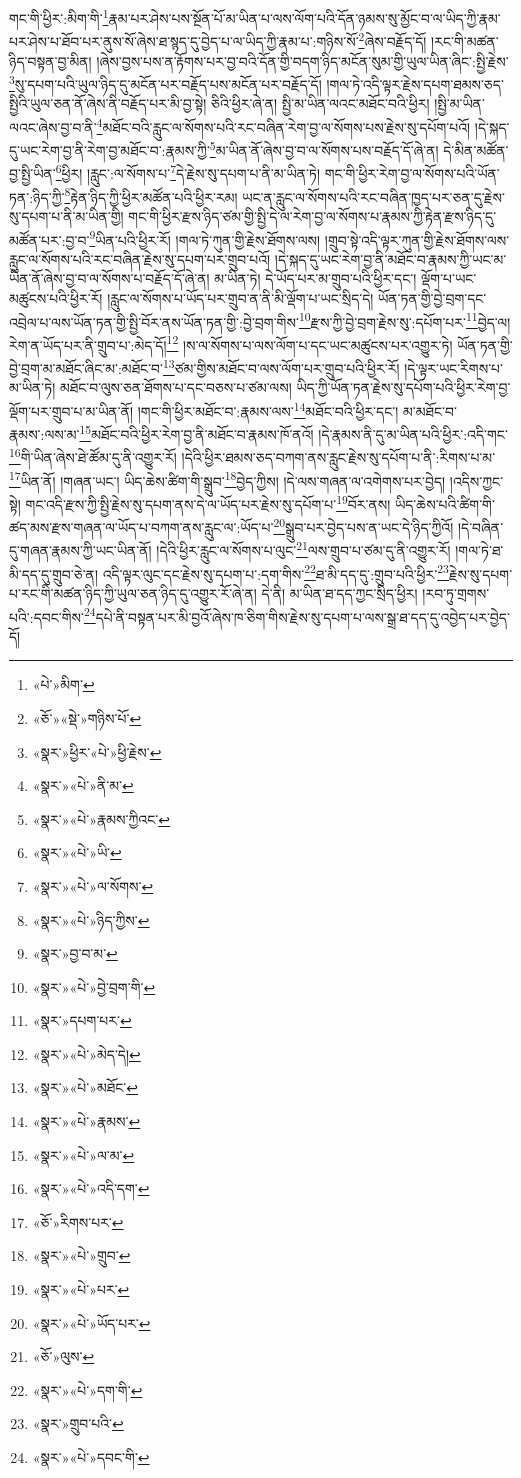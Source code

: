 གང་གི་ཕྱིར་:མིག་གི་\footnote{«པེ་»མིག་}རྣམ་པར་ཤེས་པས་སྔོན་པོ་མ་ཡིན་པ་ལས་ལོག་པའི་དོན་ཉམས་སུ་མྱོང་བ་ལ་ཡིད་ཀྱི་རྣམ་པར་ཤེས་པ་ཐོབ་པར་ནུས་སོ་ཞེས་ཐ་སྙད་དུ་བྱེད་པ་ལ་ཡིད་ཀྱི་རྣམ་པ་:གཉིས་སོ་\footnote{«ཅོ་»«སྡེ་»གཉིས་པོ་}ཞེས་བརྗོད་དོ། །རང་གི་མཚན་ཉིད་བསྟན་བྱ་མིན། །ཞེས་བྱས་པས་ན་རྟོགས་པར་བྱ་བའི་དོན་གྱི་བདག་ཉིད་མངོན་སུམ་གྱི་ཡུལ་ཡིན་ཞིང་:སྤྱི་རྗེས་\footnote{«སྣར་»ཕྱིར་«པེ་»ཕྱི་རྗེས་}སུ་དཔག་པའི་ཡུལ་ཉིད་དུ་མངོན་པར་བརྗོད་པས་མངོན་པར་བརྗོད་དོ། །གལ་ཏེ་འདི་ལྟར་རྗེས་དཔག་ཐམས་ཅད་སྤྱིའི་ཡུལ་ཅན་ནོ་ཞེས་ནི་བརྗོད་པར་མི་བྱ་སྟེ། ཅིའི་ཕྱིར་ཞེ་ན། སྤྱི་མ་ཡིན་ལའང་མཐོང་བའི་ཕྱིར། །སྤྱི་མ་ཡིན་ལའང་ཞེས་བྱ་བ་ནི་\footnote{«སྣར་»«པེ་»ནི་མ་}མཐོང་བའི་རླུང་ལ་སོགས་པའི་རང་བཞིན་རེག་བྱ་ལ་སོགས་པས་རྗེས་སུ་དཔོག་པའོ། །དེ་སྐད་དུ་ཡང་རེག་བྱ་ནི་རེག་བྱ་མཐོང་བ་:རྣམས་ཀྱི་\footnote{«སྣར་»«པེ་»རྣམས་ཀྱིའང་}མ་ཡིན་ནོ་ཞེས་བྱ་བ་ལ་སོགས་པས་བརྗོད་དོ་ཞེ་ན། དེ་མིན་མཚོན་བྱ་སྤྱི་ཡིན་\footnote{«སྣར་»«པེ་»ཡི་}ཕྱིར། །རླུང་:ལ་སོགས་པ་\footnote{«སྣར་»«པེ་»ལ་སོགས་}དེ་རྗེས་སུ་དཔག་པ་ནི་མ་ཡིན་ཏེ། གང་གི་ཕྱིར་རེག་བྱ་ལ་སོགས་པའི་ཡོན་ཏན་:ཉིད་ཀྱི་\footnote{«སྣར་»«པེ་»ཉིད་ཀྱིས་}རྟེན་ཉིད་ཀྱི་ཕྱིར་མཚོན་པའི་ཕྱིར་རམ། ཡང་ན་རླུང་ལ་སོགས་པའི་རང་བཞིན་ཁྱད་པར་ཅན་དུ་རྗེས་སུ་དཔག་པ་ནི་མ་ཡིན་གྱི། གང་གི་ཕྱིར་རྫས་ཉིད་ཙམ་གྱི་སྤྱི་དེ་ལ་རེག་བྱ་ལ་སོགས་པ་རྣམས་ཀྱི་རྟེན་རྫས་ཉིད་དུ་མཚོན་པར་:བྱ་བ་\footnote{«སྣར་»བྱ་བ་མ་}ཡིན་པའི་ཕྱིར་རོ། །གལ་ཏེ་ཀུན་གྱི་རྗེས་ཐོགས་ལས། །གྲུབ་སྟེ་འདི་ལྟར་ཀུན་གྱི་རྗེས་ཐོགས་ལས་རླུང་ལ་སོགས་པའི་རང་བཞིན་རྗེས་སུ་དཔག་པར་གྲུབ་པའོ། །དེ་སྐད་དུ་ཡང་རེག་བྱ་ནི་མཐོང་བ་རྣམས་ཀྱི་ཡང་མ་ཡིན་ནོ་ཞེས་བྱ་བ་ལ་སོགས་པ་བརྗོད་དོ་ཞེ་ན། མ་ཡིན་ཏེ། དེ་ཡོད་པར་མ་གྲུབ་པའི་ཕྱིར་དང་། ལྡོག་པ་ཡང་མཚུངས་པའི་ཕྱིར་རོ། །རླུང་ལ་སོགས་པ་ཡོད་པར་གྲུབ་ན་ནི་མི་ལྡོག་པ་ཡང་སྲིད་དེ། ཡོན་ཏན་གྱི་བྱེ་བྲག་དང་འབྲེལ་པ་ལས་ཡོན་ཏན་གྱི་སྤྱི་བོར་ནས་ཡོན་ཏན་གྱི་:བྱེ་བྲག་གིས་\footnote{«སྣར་»«པེ་»བྱེ་བྲག་གི་}རྫས་ཀྱི་བྱེ་བྲག་རྗེས་སུ་:དཔོག་པར་\footnote{«སྣར་»དཔག་པར་}བྱེད་ལ། རེག་ན་ཡོད་པར་ནི་གྲུབ་པ་:མེད་དོ།\footnote{«སྣར་»«པེ་»མེད་དེ།} །ས་ལ་སོགས་པ་ལས་ལོག་པ་དང་ཡང་མཚུངས་པར་འགྱུར་ཏེ། ཡོན་ཏན་གྱི་བྱེ་བྲག་མ་མཐོང་ཞིང་མ་:མཐོང་བ་\footnote{«སྣར་»«པེ་»མཐོང་}ཙམ་གྱིས་མཐོང་བ་ལས་ལོག་པར་གྲུབ་པའི་ཕྱིར་རོ། །དེ་ལྟར་ཡང་རིགས་པ་མ་ཡིན་ཏེ། མཐོང་བ་ལུས་ཅན་ཐོགས་པ་དང་བཅས་པ་ཙམ་ལས། ཡིད་ཀྱི་ཡོན་ཏན་རྗེས་སུ་དཔོག་པའི་ཕྱིར་རེག་བྱ་ལྡོག་པར་གྲུབ་པ་མ་ཡིན་ནོ། །གང་གི་ཕྱིར་མཐོང་བ་:རྣམས་ལས་\footnote{«སྣར་»«པེ་»རྣམས་}མཐོང་བའི་ཕྱིར་དང་། མ་མཐོང་བ་རྣམས་:ལས་མ་\footnote{«སྣར་»«པེ་»ལ་མ་}མཐོང་བའི་ཕྱིར་རེག་བྱ་ནི་མཐོང་བ་རྣམས་ཁོ་ནའོ། །དེ་རྣམས་ནི་དུ་མ་ཡིན་པའི་ཕྱིར་:འདི་གང་\footnote{«སྣར་»«པེ་»འདི་དག་}གི་ཡིན་ཞེས་ཐེ་ཚོམ་དུ་ནི་འགྱུར་རོ། །དེའི་ཕྱིར་ཐམས་ཅད་བཀག་ནས་རླུང་རྗེས་སུ་དཔོག་པ་ནི་:རིགས་པ་མ་\footnote{«ཅོ་»རིགས་པར་}ཡིན་ནོ། །གཞན་ཡང་། ཡིད་ཆེས་ཚིག་གི་སྒྲུབ་\footnote{«སྣར་»«པེ་»གྲུབ་}བྱེད་ཀྱིས། །དེ་ལས་གཞན་ལ་འགེགས་པར་བྱེད། །འདིས་ཀྱང་སྟེ། གང་འདི་རྫས་ཀྱི་སྤྱི་རྗེས་སུ་དཔག་ནས་དེ་ལ་ཡོད་པར་རྗེས་སུ་དཔོག་པ་\footnote{«སྣར་»«པེ་»པར་}བོར་ནས། ཡིད་ཆེས་པའི་ཚིག་གི་ཚད་མས་རྫས་གཞན་ལ་ཡོད་པ་བཀག་ནས་རླུང་ལ་:ཡོད་པ་\footnote{«སྣར་»«པེ་»ཡོད་པར་}སྒྲུབ་པར་བྱེད་པས་ན་ཡང་དེ་ཉིད་ཀྱིའོ། །དེ་བཞིན་དུ་གཞན་རྣམས་ཀྱི་ཡང་ཡིན་ནོ། །དེའི་ཕྱིར་རླུང་ལ་སོགས་པ་ལུང་\footnote{«ཅོ་»ལུས་}ལས་གྲུབ་པ་ཙམ་དུ་ནི་འགྱུར་རོ། །གལ་ཏེ་ཐ་མི་དད་དུ་གྲུབ་ཅེ་ན། འདི་ལྟར་ལུང་དང་རྗེས་སུ་དཔག་པ་:དག་གིས་\footnote{«སྣར་»«པེ་»དག་གི་}ཐ་མི་དད་དུ་:གྲུབ་པའི་ཕྱིར་\footnote{«སྣར་»གྲུབ་པའི་}རྗེས་སུ་དཔག་པ་རང་གི་མཚན་ཉིད་ཀྱི་ཡུལ་ཅན་ཉིད་དུ་འགྱུར་རོ་ཞེ་ན། དེ་ནི། མ་ཡིན་ཐ་དད་ཀྱང་སྲིད་ཕྱིར། །རབ་ཏུ་གྲགས་པའི་:དབང་གིས་\footnote{«སྣར་»«པེ་»དབང་གི་}དཔེ་ནི་བསྟན་པར་མི་བྱའོ་ཞེས་ཁ་ཅིག་གིས་རྗེས་སུ་དཔག་པ་ལས་སྒྲ་ཐ་དད་དུ་འབྱེད་པར་བྱེད་དོ། 